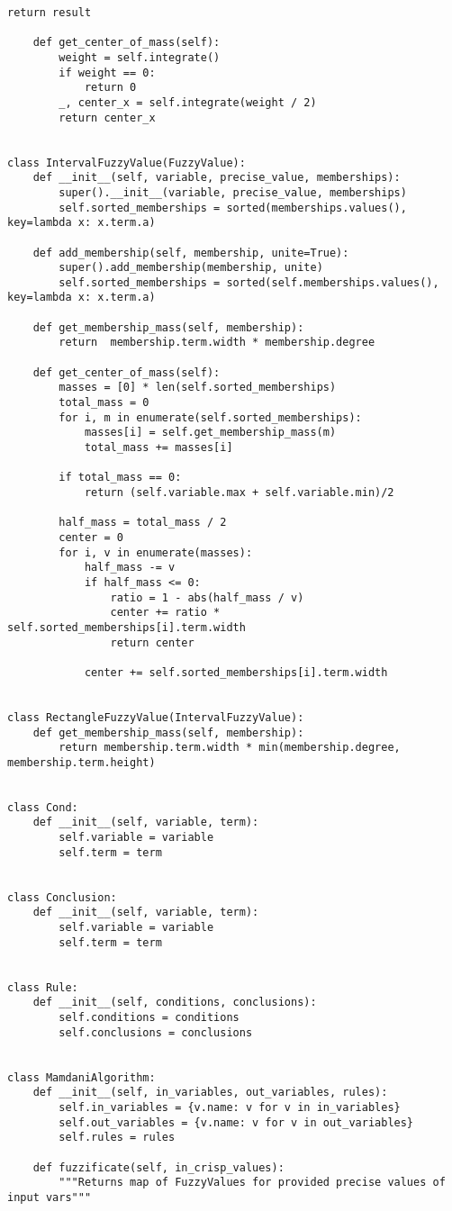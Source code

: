 \begin{lstlisting}[style=pythonstyle,caption={ }, label=lst:func:1]
		return result

	def get_center_of_mass(self):
		weight = self.integrate()
		if weight == 0:
			return 0
		_, center_x = self.integrate(weight / 2)
		return center_x


class IntervalFuzzyValue(FuzzyValue):
	def __init__(self, variable, precise_value, memberships):
		super().__init__(variable, precise_value, memberships)
		self.sorted_memberships = sorted(memberships.values(), key=lambda x: x.term.a)

	def add_membership(self, membership, unite=True):
		super().add_membership(membership, unite)
		self.sorted_memberships = sorted(self.memberships.values(), key=lambda x: x.term.a)

	def get_membership_mass(self, membership):
		return  membership.term.width * membership.degree

	def get_center_of_mass(self):
		masses = [0] * len(self.sorted_memberships)
		total_mass = 0
		for i, m in enumerate(self.sorted_memberships):
			masses[i] = self.get_membership_mass(m)
			total_mass += masses[i]

		if total_mass == 0:
			return (self.variable.max + self.variable.min)/2

		half_mass = total_mass / 2
		center = 0
		for i, v in enumerate(masses):
			half_mass -= v
			if half_mass <= 0:
				ratio = 1 - abs(half_mass / v)
				center += ratio * self.sorted_memberships[i].term.width
				return center

			center += self.sorted_memberships[i].term.width


class RectangleFuzzyValue(IntervalFuzzyValue):
	def get_membership_mass(self, membership):
		return membership.term.width * min(membership.degree, membership.term.height)


class Cond:
	def __init__(self, variable, term):
		self.variable = variable
		self.term = term


class Conclusion:
	def __init__(self, variable, term):
		self.variable = variable
		self.term = term


class Rule:
	def __init__(self, conditions, conclusions):
		self.conditions = conditions
		self.conclusions = conclusions


class MamdaniAlgorithm:
	def __init__(self, in_variables, out_variables, rules):
		self.in_variables = {v.name: v for v in in_variables}
		self.out_variables = {v.name: v for v in out_variables}
		self.rules = rules

	def fuzzificate(self, in_crisp_values):
		"""Returns map of FuzzyValues for provided precise values of input vars"""


\end{lstlisting}
